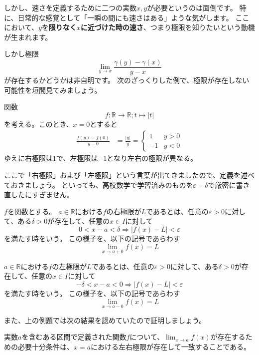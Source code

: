 しかし、速さを定義するために二つの実数$x,y$が必要というのは面倒です。
特に、日常的な感覚として「一瞬の間にも速さはある」ような気がします。
ここにおいて、$y$を\textbf{限りなく$x$に近づけた時の速さ}、つまり極限を知りたいという動機が生まれます。

しかし極限
\[
  \lim_{y\to x}\frac{\gamma(y)-\gamma(x)}{y-x}
\]
が存在するかどうかは非自明です。
次のざっくりした例で、極限が存在しない可能性を垣間見てみましょう。

\begin{example}
  関数
  \[
    f:\mathbb{R}\to\mathbb{R};t\mapsto|t|
  \]
  を考える。このとき、$x=0$とすると
  \begin{align*}
    \frac{f(y)-f(0)}{y-0}&=\frac{|y|}{y}=\begin{cases}
      1 & y>0\\
      -1 & y<0
    \end{cases}
  \end{align*}
  ゆえに右極限は$1$で、左極限は$-1$となり左右の極限が異なる。
\end{example}
ここで「右極限」および「左極限」という言葉が出てきましたので、定義を述べておきましょう。
といっても、高校数学で学習済みのものを$\varepsilon-\delta$で厳密に書き直したにすぎません。
\begin{definition}
  $f$を関数とする。
  $a\in\mathbb{R}$における$f$の右極限が$L$であるとは、任意の$\varepsilon>0$に対して、ある$\delta>0$が存在して、任意の$x\in I$に対して
  \[0<x-a<\delta\Rightarrow|f(x)-L|<\varepsilon\]
  を満たす時をいう。
  この様子を、以下の記号であらわす
  \[
    \lim_{x\to a+0}f(x)=L
  \]

  $a\in\mathbb{R}$における$f$の左極限が$L$であるとは、任意の$\varepsilon>0$に対して、ある$\delta>0$が存在して、任意の$x\in I$に対して
  \[-\delta<x-a<0\Rightarrow|f(x)-L|<\varepsilon\]
  を満たす時をいう。
  この様子を、以下の記号であらわす
  \[
    \lim_{x\to a-0}f(x)=L
  \]
\end{definition}
また、上の例題では次の結果を認めていたので証明しましょう。
\begin{theorem}
  実数$a$を含むある区間で定義された関数$f$について、$\lim_{x\to a}f(x)$が存在するための必要十分条件は、$x=a$における左右極限が存在して一致することである。
\end{theorem}
